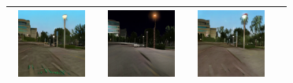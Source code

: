 \documentclass{VUMIFPSbakalaurinis}
\begin{document}
\begin{table}[H]
{\begin{tabular}{|c|c|c|c|}
            \includegraphics[width=100,height=85]{img/pvz/7_cycle} & \includegraphics[width=100,height=85]{img/pvz/7_cut} & \includegraphics[width=100,height=85]{img/pvz/7_mspc}
            \\
            \hline
            \end{tabular}
        }
        \label{tab:table example}
    \end{table}
\end{document}
